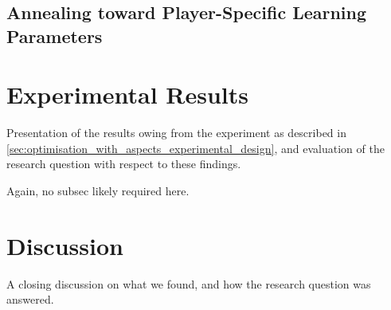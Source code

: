 

\subsection{Annealing toward Player-Specific Learning Parameters}




\section{Experimental Results}\label{sec:optimisation_with_aspects_experimental_results}

Presentation of the results owing from the experiment as described in
\cref{sec:optimisation_with_aspects_experimental_design}, and evaluation of the
research question with respect to these findings.

Again, no subsec likely required here.

\section{Discussion}\label{sec:optimisation_with_aspects_discussion}

A closing discussion on what we found, and how the research question was
answered.